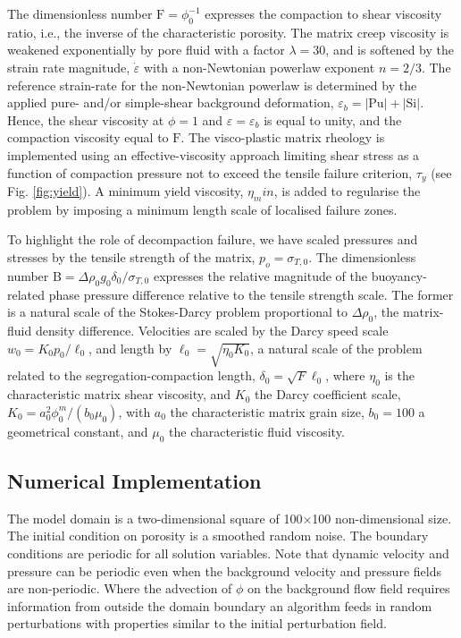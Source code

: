 \documentclass[12pt,a4paper]{article}
\begin{document}
The dimensionless number $\mathrm{F} = \phi_0^{-1}$ expresses the compaction to shear viscosity ratio, i.e., the inverse of the characteristic porosity. The matrix creep viscosity is weakened exponentially by pore fluid with a factor $\lambda=30$, and is softened by the strain rate magnitude, $\dot{\varepsilon}$ with a non-Newtonian powerlaw exponent $n=2/3$. The reference strain-rate for the non-Newtonian powerlaw is determined by the applied pure- and/or simple-shear background deformation, $\varepsilon_b = |\mathrm{Pu}| + |\mathrm{Si}|$. Hence, the shear viscosity at $\phi = 1$ and $\varepsilon = \varepsilon_b$ is equal to unity, and the compaction viscosity equal to $\mathrm{F}$. The visco-plastic matrix rheology is implemented using an effective-viscosity approach limiting shear stress as a function of compaction pressure not to exceed the tensile failure criterion, $\tau_y$ (see Fig. \ref{fig:yield}). A minimum yield viscosity, $\eta_min$, is added to regularise the problem by imposing a minimum length scale of localised failure zones.

To highlight the role of decompaction failure, we have scaled pressures and stresses by the tensile strength of the matrix, $p_o = \sigma_{T,0}$. The dimensionless number $\mathrm{B} = \Delta \rho_0 g_0 \delta_0 / \sigma_{T,0}$ expresses the relative magnitude of the buoyancy-related phase pressure difference relative to the tensile strength scale. The former is a natural scale of the Stokes-Darcy problem proportional to $\Delta \rho_0$, the matrix-fluid density difference. Velocities are scaled by the Darcy speed scale $w_0 = K_0 p_0/\ell_0$, and length by $\ell_0 = \sqrt{\eta_0 K_0}$, a natural scale of the problem related to the segregation-compaction length, $\delta_0 =  \sqrt{F} \ell_0$, where $\eta_0$ is the characteristic matrix shear viscosity, and $K_0$ the Darcy coefficient scale, $K_0 = a_0^2 \phi_0^m / (b_0 \mu_0)$, with $a_0$ the characteristic matrix grain size, $b_0 = 100$ a geometrical constant, and $\mu_0$ the characteristic fluid viscosity.

\subsection{Numerical Implementation}

The model domain is a two-dimensional square of 100$\times$100 non-dimensional size. The initial condition on porosity is a smoothed random noise. The boundary conditions are periodic for all solution variables. Note that dynamic velocity and pressure can be periodic even when the background velocity and pressure fields are non-periodic. Where the advection of $\phi$ on the background flow field requires information from outside the domain boundary an algorithm feeds in random perturbations with properties similar to the initial perturbation field.
\end{document}
